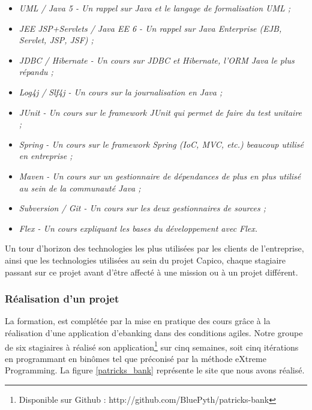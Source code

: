 \begin{itemize}
  \item \em{UML / Java 5} - Un rappel sur Java et le langage de formalisation UML ;
  \item \em{JEE JSP+Servlets / Java EE 6} - Un rappel sur Java Enterprise (EJB, Servlet, JSP, JSF) ;
  \item \em{JDBC / Hibernate} - Un cours sur JDBC et Hibernate, l'ORM Java le plus répandu ;
  \item \em{Log4j / Slf4j} - Un cours sur la journalisation en Java ;
  \item \em{JUnit} - Un cours sur le framework JUnit qui permet de faire du test unitaire ;
  \item \em{Spring} - Un cours sur le framework Spring (IoC, MVC, etc.) beaucoup utilisé en entreprise ;
  \item \em{Maven} - Un cours sur un gestionnaire de dépendances de plus en plus utilisé au sein de la communauté Java ;
  \item \em{Subversion / Git} - Un cours sur les deux gestionnaires de sources ;
  \item \em{Flex} - Un cours expliquant les bases du développement avec Flex.
\end{itemize}

Un tour d'horizon des technologies les plus utilisées par les clients de l'entreprise, ainsi que les technologies utilisées au sein du projet Capico, chaque stagiaire passant sur ce projet avant d'être affecté à une mission ou à un projet différent.

\subsubsection{Réalisation d'un projet}

La formation, est complétée par la mise en pratique des cours grâce à la réalisation d'une application d'ebanking dans des conditions agiles. Notre groupe de six stagiaires à réalisé son application\footnote{Disponible sur Github : http://github.com/BluePyth/patricks-bank} sur cinq semaines, soit cinq itérations en programmant en binômes tel que préconisé par la méthode eXtreme Programming. La figure \ref{patricks_bank} représente le site que nous avons réalisé.

